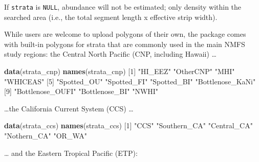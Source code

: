 \documentclass[
]{book}
\newenvironment{Shaded}{\begin{snugshade}}{\end{snugshade}}
\newcommand{\DecValTok}[1]{\textcolor[rgb]{0.00,0.00,0.81}{#1}}
\newcommand{\KeywordTok}[1]{\textcolor[rgb]{0.13,0.29,0.53}{\textbf{#1}}}
\newcommand{\NormalTok}[1]{#1}
\newcommand{\StringTok}[1]{\textcolor[rgb]{0.31,0.60,0.02}{#1}}
\begin{document}
If \texttt{strata} is \texttt{NULL}, abundance will not be estimated; only density within the searched area (i.e., the total segment length x effective strip width).

While users are welcome to upload polygons of their own, the package comes with built-in polygons for strata that are commonly used in the main NMFS study regions: the Central North Pacific (CNP, including Hawaii) \ldots{}

\begin{Shaded}
\begin{Highlighting}[]
\KeywordTok{data}\NormalTok{(strata_cnp) }
\KeywordTok{names}\NormalTok{(strata_cnp)}
\NormalTok{ [}\DecValTok{1}\NormalTok{] }\StringTok{"HI_EEZ"}          \StringTok{"OtherCNP"}        \StringTok{"MHI"}             \StringTok{"WHICEAS"}        
\NormalTok{ [}\DecValTok{5}\NormalTok{] }\StringTok{"Spotted_OU"}      \StringTok{"Spotted_FI"}      \StringTok{"Spotted_BI"}      \StringTok{"Bottlenose_KaNi"}
\NormalTok{ [}\DecValTok{9}\NormalTok{] }\StringTok{"Bottlenose_OUFI"} \StringTok{"Bottlenose_BI"}   \StringTok{"NWHI"}           
\end{Highlighting}
\end{Shaded}

\ldots the California Current System (CCS) \ldots{}

\begin{Shaded}
\begin{Highlighting}[]
\KeywordTok{data}\NormalTok{(strata_ccs) }
\KeywordTok{names}\NormalTok{(strata_ccs)}
\NormalTok{[}\DecValTok{1}\NormalTok{] }\StringTok{"CCS"}         \StringTok{"Southern_CA"} \StringTok{"Central_CA"}  \StringTok{"Nothern_CA"}  \StringTok{"OR_WA"}      
\end{Highlighting}
\end{Shaded}

\ldots{} and the Eastern Tropical Pacific (ETP):
\end{document}
